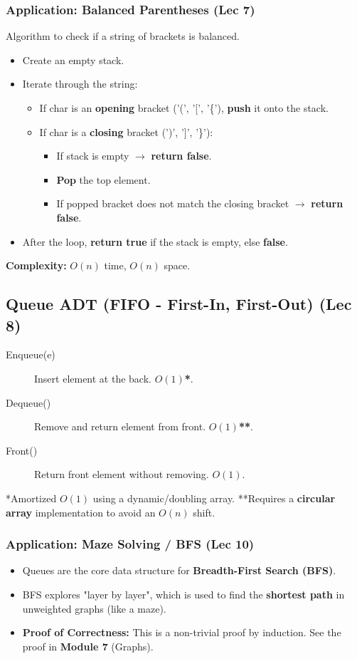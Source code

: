 \subsubsection{Application: Balanced Parentheses (Lec 7)}
Algorithm to check if a string of brackets is balanced.
\begin{itemize}
    \item Create an empty stack.
    \item Iterate through the string:
    \begin{itemize}
        \item If char is an \textbf{opening} bracket ('(', '[', '\{'), \textbf{push} it onto the stack.
        \item If char is a \textbf{closing} bracket (')', ']', '\}'):
        \begin{itemize}
            \item If stack is empty $\to$ \textbf{return false}.
            \item \textbf{Pop} the top element.
            \item If popped bracket does not match the closing bracket $\to$ \textbf{return false}.
        \end{itemize}
    \end{itemize}
    \item After the loop, \textbf{return true} if the stack is empty, else \textbf{false}.
\end{itemize}
\textbf{Complexity:} $O(n)$ time, $O(n)$ space.

\subsection{Queue ADT (FIFO - First-In, First-Out) (Lec 8)}
\begin{description}
    \item[Enqueue(e)] Insert element at the back. \textbf{$O(1)$*}.
    \item[Dequeue()] Remove and return element from front. \textbf{$O(1)$**}.
    \item[Front()] Return front element without removing. \textbf{$O(1)$}.
\end{description}
\begin{footnotesize}
*Amortized $O(1)$ using a dynamic/doubling array.
**Requires a \textbf{circular array} implementation to avoid an $O(n)$ shift.
\end{footnotesize}

\subsubsection{Application: Maze Solving / BFS (Lec 10)}
\begin{itemize}
    \item Queues are the core data structure for \textbf{Breadth-First Search (BFS)}.
    \item BFS explores "layer by layer", which is used to find the \textbf{shortest path} in unweighted graphs (like a maze).
    \item \textbf{Proof of Correctness:} This is a non-trivial proof by induction. See the proof in \textbf{Module 7} (Graphs).
\end{itemize}

